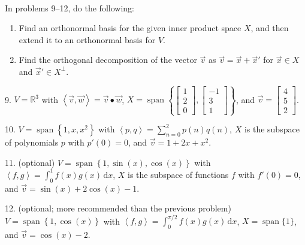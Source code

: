 \documentclass{article}
\begin{document}
~\\

In problems 9--12, do the following:

\begin{enumerate}

	\item Find an orthonormal basis for the given inner product space $X$, and then extend it to an orthonormal basis for $V$.

	\item Find the orthogonal decomposition of the vector $\vec{v}$ as $\vec{v} = \vec{x} + \vec{x}'$ for $\vec{x} \in X$ and $\vec{x}' \in X^\perp$.

\end{enumerate}

9. $V = \mathbb{R}^3$ with $\left< \vec{v}, \vec{w} \right> = \vec{v} \bullet \vec{w}$, $X = \operatorname{span}\left\{ \left[\begin{array}{c} 1 \\ 2 \\ 0 \end{array}\right], \left[\begin{array}{c} -1 \\ 3 \\ 1 \end{array}\right] \right\}$, and $\vec{v} = \left[\begin{array}{c} 4 \\ 5 \\ 2 \end{array}\right]$.

10. $V = \operatorname{span}\left\{ 1, x, x^2 \right\}$ with $\left< p, q \right> = \sum_{n = 0}^2 p(n)q(n)$, $X$ is the subspace of polynomials $p$ with $p'(0) = 0$, and $\vec{v} = 1 + 2x + x^2$.

11. (optional) $V = \operatorname{span}\left\{ 1, \sin(x), \cos(x) \right\}$ with $\left< f, g \right> = \int_0^1 f(x)g(x)\,\text{d} x$, $X$ is the subspace of functions $f$ with $f'(0) = 0$, and $\vec{v} = \sin(x) + 2\cos(x) - 1$.

12. (optional; more recommended than the previous problem) $V = \operatorname{span}\left\{ 1, \cos(x) \right\}$ with $\left< f, g \right> = \int_0^{\pi/2} f(x)g(x)\,\text{d} x$, $X = \operatorname{span}\{1\}$, and $\vec{v} = \cos(x) - 2$.
\end{document}
